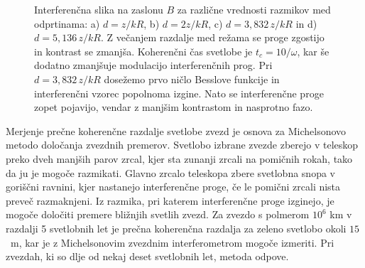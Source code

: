 \begin{figure}[h]
\begin{center}
\def\svgwidth{0.37\textwidth} 

\def\svgwidth{0.37\textwidth} 

\def\svgwidth{0.37\textwidth} 

\def\svgwidth{0.37\textwidth} 

\caption{Interferenčna slika na zaslonu
$B$ za različne vrednosti razmikov med odprtinama: a) $d = z/kR$, b) $d=2z/kR$, 
c) $d = 3,832\,z/kR$ in d) $d = 5,136\,z/kR$. 
Z večanjem razdalje med režama se proge zgostijo in kontrast se zmanjša. Koherenčni
čas svetlobe je $t_{c}=10/\omega$, kar še dodatno zmanjšuje modulacijo
interferenčnih prog. Pri $d=3,832\,z/kR$ dosežemo prvo ničlo Besslove
funkcije in interferenčni vzorec popolnoma izgine. Nato se interferenčne
proge zopet pojavijo, vendar z manjšim kontrastom in nasprotno fazo.}
\label{fig:Interferencna-slika}
\end{center}
\end{figure}

\begin{remark}
Merjenje prečne koherenčne razdalje svetlobe
zvezd je osnova za Michelsonovo metodo določanja zvezdnih premerov.
Svetlobo izbrane zvezde zberejo v teleskop preko dveh manjših parov
zrcal, kjer sta zunanji zrcali na pomičnih rokah, tako da ju je mogoče
razmikati. Glavno zrcalo teleskopa zbere svetlobna snopa v goriščni
ravnini, kjer nastanejo interferenčne proge, če le pomični zrcali
nista preveč razmaknjeni. Iz razmika, pri katerem interferenčne proge
izginejo, je mogoče določiti premere bližnjih svetlih zvezd. Za zvezdo
s polmerom $10^{6}$ km v razdalji 5 svetlobnih let je prečna koherenčna
razdalja za zeleno svetlobo okoli $15$~m, kar je z Michelsonovim
zvezdnim interferometrom mogoče izmeriti. Pri zvezdah, ki so dlje
od nekaj deset svetlobnih let, metoda odpove.
\end{remark}

